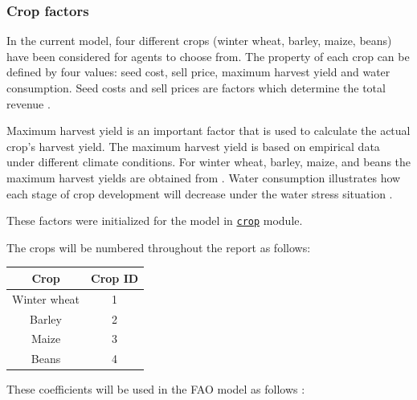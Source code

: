 \documentclass[a4paper,12pt]{article} %
\begin{document}
\subsubsection{Crop factors}
In the current model, four different crops (winter wheat, barley, maize, beans) have been considered for agents to choose from. 
The property of each crop can be defined by four values: seed cost, sell price, maximum harvest yield and water consumption. Seed costs and sell prices are factors which determine the total revenue \cite{Jose}. 


Maximum harvest yield is an important factor that is used to calculate the actual crop’s harvest yield.  The maximum harvest yield is based on empirical data under different climate conditions. For winter wheat, barley, maize, and beans the maximum harvest yields are obtained from \cite{w9030157}. Water consumption illustrates how each stage of crop development will decrease under the water stress situation \cite{VAUX198361}.

These factors were initialized for the model in \href{https://n.ethz.ch/~cgolling/gess/html/code/crops.html}{\texttt{crop}} module.

The crops will be numbered throughout the report as follows:
\begin{center}
\begin{tabular}{ ||c|c|| } 
\hline
Crop & Crop ID  \\
\hline
Winter wheat & 1\\
Barley & 2 \\
Maize & 3 \\
Beans & 4 \\
\hline
\end{tabular}
\end{center}


These coefficients will be used in the FAO model \cite{allenFAO24Reference1991} as follows :
\end{document}
